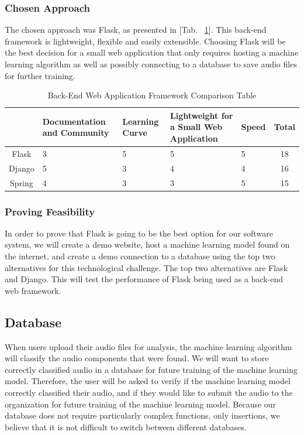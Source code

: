 \documentclass[12pt,journal,compsoc]{IEEEtran}
\newenvironment{subs}
  {\adjustwidth{1em}{0pt}}
  {\endadjustwidth}
\begin{document}
\begin{subs}
\begin{subs}
\subsubsection{Chosen Approach}
The chosen approach was Flask, as presented in [Tab. ~\ref{table:back}]. This back-end framework is lightweight, flexible and easily extensible. Choosing Flask will be the best decision for a small web application that only requires hosting a machine learning algorithm as well as possibly connecting to a database to save audio files for further training.


\begin{table}[H]
\renewcommand{\arraystretch}{1.3}
\caption{Back-End Web Application Framework Comparison Table}
\label{table:back}
\centering
\begin{tabular}{|c||m{8em}|m{8em}|m{8em}|m{8em}||c|}
\hline
&
Documentation and Community
&
Learning Curve
&
Lightweight for a Small Web Application
&
Speed
&
Total\\
\hline
\hline
Flask & 3 & 5 & 5 & 5 & 18\\
\hline
Django & 5 & 3 & 4 & 4 & 16\\
\hline
Spring & 4 & 3 & 3 & 5 & 15\\
\hline
\end{tabular}
\end{table}

\subsubsection{Proving Feasibility}
In order to prove that Flask is going to be the best option for our software system, we will create a demo website, host a machine learning model found on the internet, and create a demo connection to a database using the top two alternatives for this technological challenge. The top two alternatives are Flask and Django. This will test the performance of Flask being used as a back-end web framework.
\end{subs}

\subsection{Database}
When users upload their audio files for analysis, the machine learning algorithm will classify the audio components that were found. We will want to store correctly classified audio in a database for future training of the machine learning model. Therefore, the user will be asked to verify if the machine learning model correctly classified their audio, and if they would like to submit the audio to the organization for future training of the machine learning model. Because our database does not require particularly complex functions, only insertions, we believe that it is not difficult to switch between different databases.


\end{subs}
\end{document}
